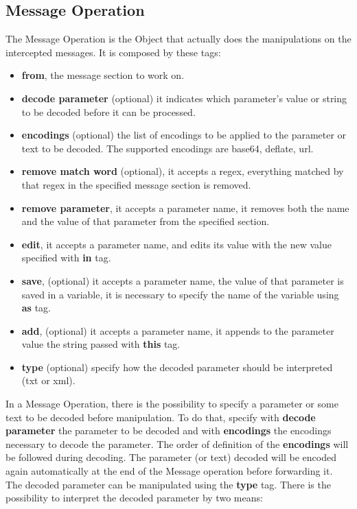 \subsection{Message Operation}
The Message Operation is the Object that actually does the manipulations on the intercepted messages. It is composed by these tags:
\begin{itemize}
    \item \textbf{from}, the message section to work on.
    \item \textbf{decode parameter} (optional) it indicates which parameter's value or string to be decoded before it can be processed.
    \item \textbf{encodings} (optional) the list of encodings to be applied to the parameter or text to be decoded. The supported encodings are base64, deflate, url.
    \item \textbf{remove match word} (optional), it accepts a regex, everything matched by that regex in the specified message section is removed.
    \item \textbf{remove parameter}, it accepts a parameter name, it removes both the name and the value of that parameter from the specified section.
    \item \textbf{edit}, it accepts a parameter name, and edits its value with the new value specified with \textbf{in} tag.
    \item \textbf{save}, (optional) it accepts a parameter name, the value of that parameter is saved in a variable, it is necessary to specify the name of the variable using \textbf{as} tag.
    \item \textbf{add}, (optional) it accepts a parameter name, it appends to the parameter value the string passed with \textbf{this} tag.
    \item \textbf{type} (optional) specify how the decoded parameter should be interpreted (txt or xml).
\end{itemize}

In a Message Operation, there is the possibility to specify a parameter or some text to be decoded before manipulation. To do that, specify with \textbf{decode parameter} the parameter to be decoded and with \textbf{encodings} the encodings necessary to decode the parameter. The order of definition of the \textbf{encodings} will be followed during decoding. The parameter (or text) decoded will be encoded again automatically at the end of the Message operation before forwarding it.
The decoded parameter can be manipulated using the \textbf{type} tag. There is the possibility to interpret the decoded parameter by two means: 


